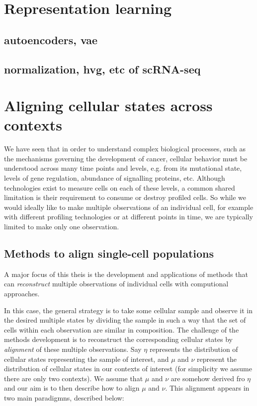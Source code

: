 \section{Representation learning}
\subsection{autoencoders, vae}
\subsection{normalization, hvg, etc of scRNA-seq}

\section{Aligning cellular states across contexts}
We have seen that in order to understand complex biological processes, such as the mechanisms governing the development of cancer, cellular behavior must be understood across many time points and levels, e.g. from its mutational state, levels of gene regulation, abundance of signalling proteins, etc.
Although technologies exist to measure cells on each of these levels,
a common shared limitation is their requirement to consume or destroy profiled cells.
So while we would ideally like to make multiple observations of an individual cell, for example with different profiling technologies or at different points in time, we are typically limited to make only one observation.

\subsection{Methods to align single-cell populations}
A major focus of this theis is the development and applications of methods that can \emph{reconstruct} multiple observations of individual cells with computional approaches.

In this case, the general strategy is to take some cellular sample
and observe it in the desired multiple states
by dividing the sample in such a way that the set of cells within each observation are similar in composition.
The challenge of the methods development is to reconstruct the corresponding cellular states by \emph{alignment} of these multiple observations.
Say $\eta$ represents the distribution of cellular states representing the sample of interest, and $\mu$ and $\nu$ represent the distribution of cellular states in our contexts of interest (for simplicity we assume there are only two contexts).
We assume that $\mu$ and $\nu$ are somehow derived fro $\eta$ and our aim is to then describe how to align $\mu$ and $\nu$.
This alignment appears in two main paradigmns, described below:

